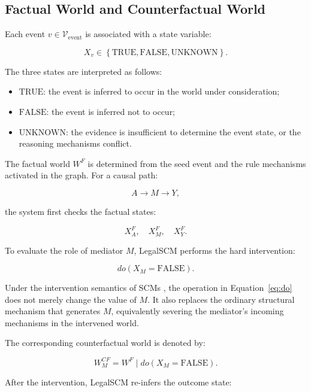 \subsection{Factual World and Counterfactual World}

Each event \(v \in \mathcal{V}_{\mathrm{event}}\) is associated with a state
variable:

\begin{equation}
X_v
\in
\left\{
    \mathrm{TRUE},
    \mathrm{FALSE},
    \mathrm{UNKNOWN}
\right\}.
\end{equation}

The three states are interpreted as follows:

\begin{itemize}
    \item \(\mathrm{TRUE}\): the event is inferred to occur in the world
    under consideration;
    \item \(\mathrm{FALSE}\): the event is inferred not to occur;
    \item \(\mathrm{UNKNOWN}\): the evidence is insufficient to determine
    the event state, or the reasoning mechanisms conflict.
\end{itemize}

The factual world \(W^{F}\) is determined from the seed event and the rule
mechanisms activated in the graph. For a causal path:

\[
A \rightarrow M \rightarrow Y,
\]

the system first checks the factual states:

\[
X_A^{F},\quad X_M^{F},\quad X_Y^{F}.
\]

To evaluate the role of mediator \(M\), LegalSCM performs the hard
intervention:

\begin{equation}
do
\left(
    X_M = \mathrm{FALSE}
\right).
\label{eq:do}
\end{equation}

Under the intervention semantics of SCMs
\cite{pearl2009causality}, the operation in Equation~\ref{eq:do} does not
merely change the value of \(M\). It also replaces the ordinary structural
mechanism that generates \(M\), equivalently severing the mediator's
incoming mechanisms in the intervened world.

The corresponding counterfactual world is denoted by:

\[
W^{CF}_{M}
=
W^{F}
\mid
do
\left(
    X_M = \mathrm{FALSE}
\right).
\]

After the intervention, LegalSCM re-infers the outcome state:

